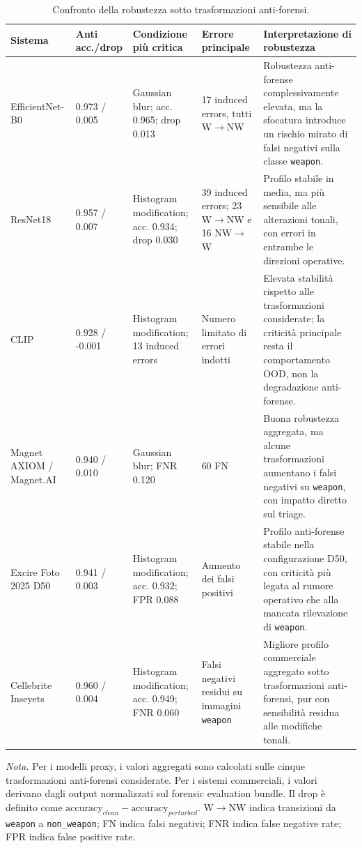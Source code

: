 \begin{table}[H]
\centering
\caption{Confronto della robustezza sotto trasformazioni anti-forensi.}
\label{tab:results-comparative-antiforensic}
\small
\renewcommand{\arraystretch}{1.18}
\setlength{\tabcolsep}{3pt}
\begin{tabularx}{\textwidth}{@{}p{2.7cm} p{1.8cm} p{3.1cm} p{2.8cm} X@{}}
\toprule
\textbf{Sistema} &
\textbf{Anti acc./drop} &
\textbf{Condizione più critica} &
\textbf{Errore principale} &
\textbf{Interpretazione di robustezza} \\
\midrule

EfficientNet-B0 &
0.973 / 0.005 &
Gaussian blur; acc. 0.965; drop 0.013 &
17 induced errors, tutti W$\rightarrow$NW &
Robustezza anti-forense complessivamente elevata, ma la sfocatura introduce un
rischio mirato di falsi negativi sulla classe \texttt{weapon}. \\

ResNet18 &
0.957 / 0.007 &
Histogram modification; acc. 0.934; drop 0.030 &
39 induced errors; 23 W$\rightarrow$NW e 16 NW$\rightarrow$W &
Profilo stabile in media, ma più sensibile alle alterazioni tonali, con errori
in entrambe le direzioni operative. \\

CLIP &
0.928 / -0.001&
Histogram modification; 13 induced errors &
Numero limitato di errori indotti &
Elevata stabilità rispetto alle trasformazioni considerate; la criticità
principale resta il comportamento OOD, non la degradazione anti-forense. \\

Magnet AXIOM / Magnet.AI &
0.940 / 0.010 &
Gaussian blur; FNR 0.120 &
60 FN &
Buona robustezza aggregata, ma alcune trasformazioni aumentano i falsi negativi
su \texttt{weapon}, con impatto diretto sul triage. \\

Excire Foto 2025 D50 &
0.941 / 0.003 &
Histogram modification; acc. 0.932; FPR 0.088 &
Aumento dei falsi positivi &
Profilo anti-forense stabile nella configurazione D50, con criticità più legata
al rumore operativo che alla mancata rilevazione di \texttt{weapon}. \\

Cellebrite Inseyets &
0.960 / 0.004 &
Histogram modification; acc. 0.949; FNR 0.060 &
Falsi negativi residui su immagini \texttt{weapon} &
Migliore profilo commerciale aggregato sotto trasformazioni anti-forensi, pur
con sensibilità residua alle modifiche tonali. \\

\bottomrule
\end{tabularx}

\vspace{0.4em}
\footnotesize
\textit{Nota.} Per i modelli proxy, i valori aggregati sono calcolati sulle
cinque trasformazioni anti-forensi considerate. Per i sistemi commerciali, i
valori derivano dagli output normalizzati sul forensic evaluation bundle. Il drop
è definito come
\(\text{accuracy}_{clean}-\text{accuracy}_{perturbed}\). W$\rightarrow$NW indica
transizioni da \texttt{weapon} a \texttt{non\_weapon}; FN indica falsi negativi;
FNR indica false negative rate; FPR indica false positive rate.
\end{table}

